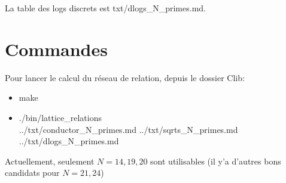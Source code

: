 \documentclass[12pt]{article}
\theoremstyle{plain}
\theoremstyle{definition}
\begin{document}
La table des logs discrets est txt/dlogs\_N\_primes.md.

\section{Commandes}
Pour lancer le calcul du réseau de relation, depuis 
le dossier Clib:
\begin{itemize}
    \item make
    \item ./bin/lattice\_relations\\ ../txt/conductor\_N\_primes.md ../txt/sqrts\_N\_primes.md ../txt/dlogs\_N\_primes.md
\end{itemize}

Actuellement, seulement $N=14,19,20$ sont utilisables (il y'a d'autres bons candidats pour $N=21,24$)
\end{document}
